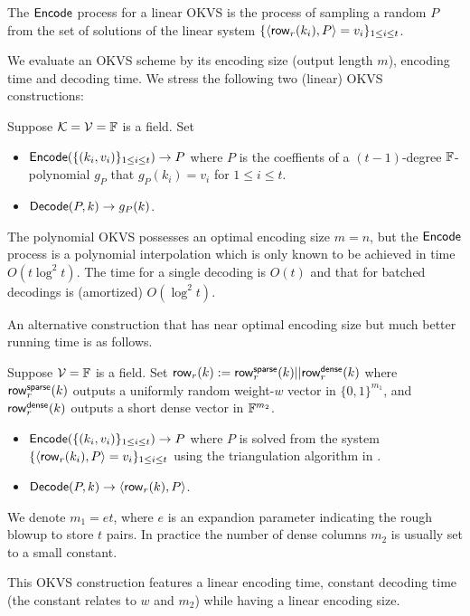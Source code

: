 The ${\sf Encode}$ process for a linear OKVS is the process of sampling a random $P$ from the set of solutions of the linear system $\{\langle {\sf row}_r(k_i), P \rangle = v_i\}_{1\le i\le t}$. 

We evaluate an OKVS scheme by its encoding size (output length $m$), encoding time and decoding time. We stress the following two (linear) OKVS constructions:
\begin{construction}[Polynomial]\label{con:OKVS_polynomial}
  Suppose $\mathcal{K} = \mathcal{V}=\mathbb{F}$ is a field. Set 
  \begin{itemize}
    \item ${\sf Encode}(\{(k_i,v_i)\}_{1\le i\le t}) \rightarrow P$ where $P$ is the coeffients of a $(t-1)$-degree $\mathbb{F}$-polynomial $g_P$ that $g_P(k_i) = v_i$ for $1\le i\le t$. 
    \item ${\sf Decode}(P,k)\rightarrow g_P(k)$. 
  \end{itemize}
\end{construction}
The polynomial OKVS possesses an optimal encoding size $m=n$, but the ${\sf Encode}$ process is a polynomial interpolation which is only known to be achieved in time $O(t\log^2t)$. The time for a single decoding is $O(t)$ and that for batched decodings is (amortized) $O(\log^2 t)$. 

An alternative construction that has near optimal encoding size but much better running time is as follows. 
\begin{construction}\label{con:OKVS_sparse_matrix}
  Suppose $\mathcal{V}=\mathbb{F}$ is a field. Set ${\sf row}_r(k):={\sf row}_r^{\sf sparse}(k)||{\sf row}_r^{\sf dense}(k)$ where ${\sf row}_r^{\sf sparse}(k)$ outputs a uniformly random weight-$w$ vector in $\{0,1\}^{m_1}$, and ${\sf row}_r^{\sf dense}(k)$ outputs a short dense vector in $\mathbb{F}^{m_2}$. 
  \begin{itemize}
    \item ${\sf Encode}(\{(k_i,v_i)\}_{1\le i\le t}) \rightarrow P$ where $P$ is solved from the system $\{\langle {\sf row}_r(k_i), P \rangle = v_i\}_{1\le i\le t}$ using the triangulation algorithm in \cite{cryptoeprint:2022/320}. 
    \item ${\sf Decode}(P,k)\rightarrow \langle {\sf row}_r(k), P \rangle$. 
  \end{itemize}
  We denote $m_1=et$, where $e$ is an expandion parameter indicating the rough blowup to store $t$ pairs. In practice the number of dense columns $m_2$ is usually set to a small constant. 
\end{construction}
This OKVS construction features a linear encoding time, constant decoding time (the constant relates to $w$ and $m_2$) while having a linear encoding size. 

